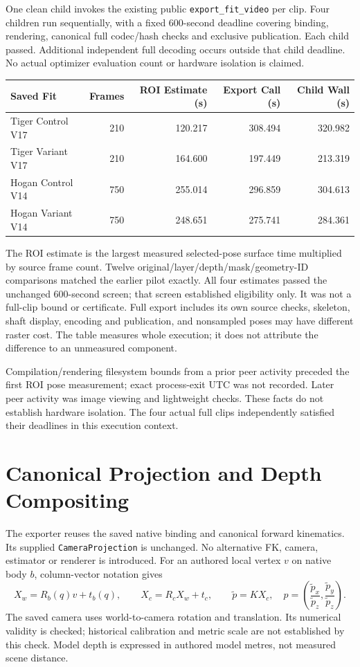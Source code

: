 \documentclass[11pt,letterpaper]{article}
\newcommand{\code}[1]{\nolinkurl{#1}}\newcommand{\hash}[1]{{\footnotesize\nolinkurl{#1}}}
\newcommand{\chapterpage}[1]{\clearpage\section{#1}}
\begin{document}
One clean child invokes the existing public \code{export_fit_video} per clip.
Four children run sequentially, with a fixed 600-second deadline covering binding,
rendering, canonical full codec/hash checks and exclusive publication. Each child passed.
Additional independent full decoding occurs outside that child deadline.
No actual optimizer evaluation count or hardware isolation is claimed.

\begin{center}\small
\begin{tabular}{@{}lrrrr@{}}\toprule
Saved Fit & Frames & ROI Estimate (s) & Export Call (s) & Child Wall (s)\\\midrule
Tiger Control V17 & 210 & 120.217 & 308.494 & 320.982\\
Tiger Variant V17 & 210 & 164.600 & 197.449 & 213.319\\
Hogan Control V14 & 750 & 255.014 & 296.859 & 304.613\\
Hogan Variant V14 & 750 & 248.651 & 275.741 & 284.361\\
\bottomrule\end{tabular}\end{center}
The ROI estimate is the largest measured selected-pose surface time multiplied by
source frame count. Twelve original/layer/depth/mask/geometry-ID comparisons matched
the earlier pilot exactly. All four estimates passed the unchanged 600-second screen;
that screen established eligibility only. It was not a full-clip bound or certificate.
Full export includes its own source checks, skeleton, shaft display, encoding and
publication, and nonsampled poses may have different raster cost. The table measures
whole execution; it does not attribute the difference to an unmeasured component.

Compilation/rendering filesystem bounds from a prior peer activity preceded the first
ROI pose measurement; exact process-exit UTC was not recorded. Later peer activity was
image viewing and lightweight checks. These facts do not establish hardware isolation.
The four actual full clips independently satisfied their deadlines in this execution context.

\chapterpage{Canonical Projection and Depth Compositing}
The exporter reuses the saved native binding and canonical forward kinematics.
Its supplied \texttt{CameraProjection} is unchanged. No alternative FK, camera,
estimator or renderer is introduced.
For an authored local vertex $v$ on native body $b$, column-vector notation gives
\[
X_w=R_b(q)v+t_b(q),\qquad X_c=R_cX_w+t_c,
\qquad \widetilde p=KX_c,\quad p=\left(\frac{\widetilde p_x}{\widetilde p_z},
\frac{\widetilde p_y}{\widetilde p_z}\right).
\]
The saved camera uses world-to-camera rotation and translation. Its numerical validity
is checked; historical calibration and metric scale are not established by this check.
Model depth is expressed in authored model metres, not measured scene distance.
\end{document}
